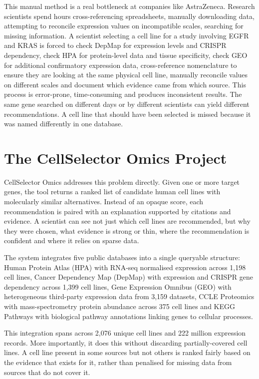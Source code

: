 \documentclass[author={Karen Coutinho, Ishaan Bhalla, Aman Raj, Dixit Kaloorani Malarmannan},
                supervisor={Dr. Daniel D'Andrea},
                degree={MSc},
                title={CellSelector Omics: A Multi-Omics Recommendation System for Cell Line Selection},
                subtitle={},
                type={},
                year={2026}]{dissertation}
\begin{document}
This manual method is a real bottleneck at companies like AstraZeneca. Research scientists spend hours cross-referencing spreadsheets, manually downloading data, attempting to reconcile expression values on incompatible scales, searching for missing information. A scientist selecting a cell line for a study involving EGFR and KRAS is forced to check DepMap for expression levels and CRISPR dependency, check HPA for protein-level data and tissue specificity, check GEO for additional confirmatory expression data, cross-reference nomenclature to ensure they are looking at the same physical cell line, manually reconcile values on different scales and document which evidence came from which source. This process is error-prone, time-consuming and produces inconsistent results. The same gene searched on different days or by different scientists can yield different recommendations. A cell line that should have been selected is missed because it was named differently in one database.

\section{The CellSelector Omics Project}

CellSelector Omics addresses this problem directly. Given one or more target genes, the tool returns a ranked list of candidate human cell lines with molecularly similar alternatives. Instead of an opaque score, each recommendation is paired with an explanation supported by citations and evidence. A scientist can see not just which cell lines are recommended, but why they were chosen, what evidence is strong or thin, where the recommendation is confident and where it relies on sparse data.

The system integrates five public databases into a single queryable structure: Human Protein Atlas (HPA) with RNA-seq normalised expression across 1,198 cell lines, Cancer Dependency Map (DepMap) with expression and CRISPR gene dependency across 1,399 cell lines, Gene Expression Omnibus (GEO) with heterogeneous third-party expression data from 3,159 datasets, CCLE Proteomics with mass-spectrometry protein abundance across 375 cell lines and KEGG Pathways with biological pathway annotations linking genes to cellular processes.

This integration spans across 2,076 unique cell lines and 222 million expression records. More importantly, it does this without discarding partially-covered cell lines. A cell line present in some sources but not others is ranked fairly based on the evidence that exists for it, rather than penalised for missing data from sources that do not cover it.
\end{document}
